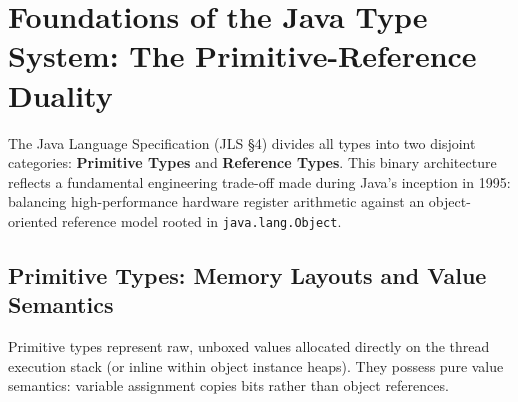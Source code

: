 \documentclass[10pt,journal,compsoc,onecolumn]{IEEEtran}
\begin{document}
\maketitle
\IEEEdisplaynontitleabstractindextext
\IEEEpeerreviewmaketitle

\section{Foundations of the Java Type System: The Primitive-Reference Duality}
\label{sec:foundations}

The Java Language Specification (JLS \S4) divides all types into two disjoint categories: \textbf{Primitive Types} and \textbf{Reference Types}. This binary architecture reflects a fundamental engineering trade-off made during Java's inception in 1995: balancing high-performance hardware register arithmetic against an object-oriented reference model rooted in \texttt{java.lang.Object}.

\subsection{Primitive Types: Memory Layouts and Value Semantics}
Primitive types represent raw, unboxed values allocated directly on the thread execution stack (or inline within object instance heaps). They possess pure value semantics: variable assignment copies bits rather than object references.
\end{document}
